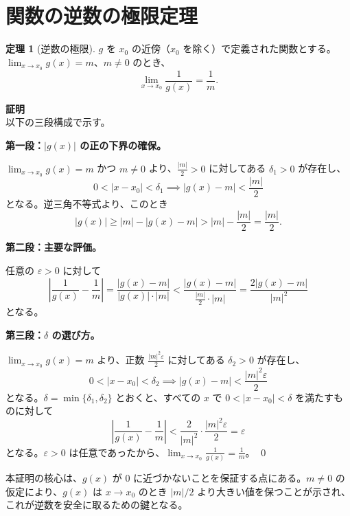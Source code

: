 \documentclass[11pt,a4paper]{jsarticle}
\theoremstyle{definition}
\newtheorem{theorem}{定理}[section]
\newcommand{\eps}{\varepsilon}
\begin{document}
\newpage

\section{関数の逆数の極限定理}\label{sec:reciprocal}

\begin{theorembox}[定理：逆数の極限]
\begin{theorem}[逆数の極限]\label{thm:reciprocal}
$g$ を $x_0$ の近傍（$x_0$ を除く）で定義された関数とする。$\lim_{x \to x_0} g(x) = m$、$m \neq 0$ のとき、
\[
\lim_{x \to x_0} \frac{1}{g(x)} = \frac{1}{m}.
\]
\end{theorem}
\end{theorembox}

\begin{proofbox}
\textbf{証明}\ \\
\noindent
以下の三段構成で示す。

\textbf{第一段：$|g(x)|$ の正の下界の確保。}

$\lim_{x \to x_0} g(x) = m$ かつ $m \neq 0$ より、$\frac{|m|}{2} > 0$ に対してある $\delta_1 > 0$ が存在し、
\[
0 < |x - x_0| < \delta_1 \implies |g(x) - m| < \frac{|m|}{2}
\]
となる。逆三角不等式より、このとき
\[
|g(x)| \geq |m| - |g(x) - m| > |m| - \frac{|m|}{2} = \frac{|m|}{2}.
\]

\textbf{第二段：主要な評価。}

任意の $\eps > 0$ に対して
\[
\left|\frac{1}{g(x)} - \frac{1}{m}\right|
= \frac{|g(x) - m|}{|g(x)| \cdot |m|}
< \frac{|g(x) - m|}{\frac{|m|}{2} \cdot |m|}
= \frac{2|g(x) - m|}{|m|^2}
\]
となる。

\textbf{第三段：$\delta$ の選び方。}

$\lim_{x \to x_0} g(x) = m$ より、正数 $\frac{|m|^2 \eps}{2}$ に対してある $\delta_2 > 0$ が存在し、
\[
0 < |x - x_0| < \delta_2 \implies |g(x) - m| < \frac{|m|^2 \eps}{2}
\]
となる。$\delta = \min\{\delta_1, \delta_2\}$ とおくと、すべての $x$ で $0 < |x - x_0| < \delta$ を満たすものに対して
\[
\left|\frac{1}{g(x)} - \frac{1}{m}\right|
< \frac{2}{|m|^2} \cdot \frac{|m|^2 \eps}{2}
= \eps
\]
となる。$\eps > 0$ は任意であったから、$\lim_{x \to x_0} \frac{1}{g(x)} = \frac{1}{m}$。 \qed
\end{proofbox}

\begin{notebox}[証明のポイント]
本証明の核心は、$g(x)$ が 0 に近づかないことを保証する点にある。$m \neq 0$ の仮定により、$g(x)$ は $x \to x_0$ のとき $|m|/2$ より大きい値を保つことが示され、これが逆数を安全に取るための鍵となる。
\end{notebox}
\end{document}
